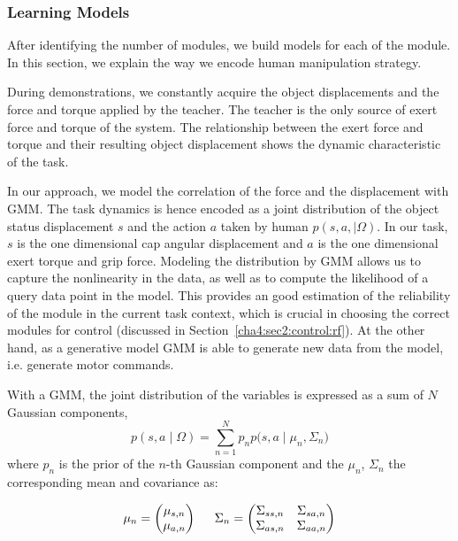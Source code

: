 \subsubsection{Learning Models}
\label{cha4:sec2:learn:model}

After identifying the number of modules, we build models for each of the module. In this section, we explain the way we encode human manipulation strategy.

During demonstrations, we constantly acquire the object displacements and the force and torque applied by the teacher. The teacher is the only source of exert force and torque of the system. The relationship between the exert force and torque and their resulting object displacement shows the dynamic characteristic of the task.

In our approach, we model the correlation of the force and the displacement with GMM. The task dynamics is hence encoded as a joint distribution of the object status displacement $s$ and the action $a$ taken by human $p(s,a,{\mid}{\Omega})$. In our task, $s$ is the one dimensional cap angular displacement and $a$ is the one dimensional exert torque and grip force.
Modeling the distribution by GMM allows us to capture the nonlinearity in the data, as well as to compute the likelihood of a query data point in the model. This provides an good estimation of the reliability of the module in the current task context, which is crucial in choosing the correct modules for control (discussed in Section~\ref{cha4:sec2:control:rf}). At the other hand, as a generative model GMM is able to generate new data from the model, i.e. generate motor commands.

With a GMM, the joint distribution of the variables is expressed as a sum of $N$ Gaussian components,
\begin{equation}
{
p(s,a\mid\Omega)
= \sum_{n=1}^N {p_{n}p(s,a\mid{\mu}_n},{\Sigma}_n)
}
\end{equation}
where $p_n$ is the prior of the $n$-th Gaussian component and the ${\mu}_n$, ${\Sigma}_n$ the corresponding mean and covariance as:

\begin{equation}
{
{\mu}_n = \begin{pmatrix}    {\mu}_{s,n}     \\
                             {\mu}_{a,n}          \\
                    \end{pmatrix}
\hspace{0.2in}
{\Sigma}_n = \begin{pmatrix}     {\Sigma}_{ss,n}  &
                                 {\Sigma}_{sa,n} \\
                                 {\Sigma}_{as,n}  &
                                 {\Sigma}_{aa,n}   \\

                        \end{pmatrix}
}
\end{equation}

